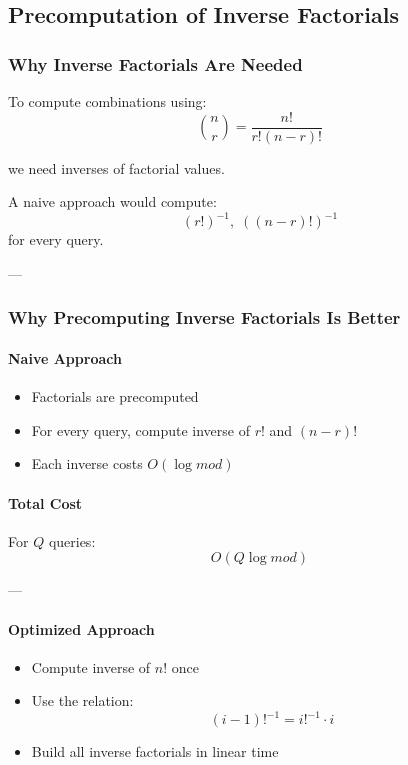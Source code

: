 \documentclass[11pt]{article}
\begin{document}
\subsection{Precomputation of Inverse Factorials}

\subsubsection{Why Inverse Factorials Are Needed}

To compute combinations using:
\[
\binom{n}{r} = \frac{n!}{r!(n-r)!}
\]

we need inverses of factorial values.

A naive approach would compute:
\[
(r!)^{-1},\; ((n-r)!)^{-1}
\]
for every query.

---

\subsubsection{Why Precomputing Inverse Factorials Is Better}

\paragraph{Naive Approach}
\begin{itemize}
    \item Factorials are precomputed
    \item For every query, compute inverse of $r!$ and $(n-r)!$
    \item Each inverse costs $O(\log mod)$
\end{itemize}

\paragraph{Total Cost}
For $Q$ queries:
\[
O(Q \log mod)
\]

---

\paragraph{Optimized Approach}
\begin{itemize}
    \item Compute inverse of $n!$ once
    \item Use the relation:
    \[
    (i-1)!^{-1} = i!^{-1} \cdot i
    \]
    \item Build all inverse factorials in linear time
\end{itemize}
\end{document}
